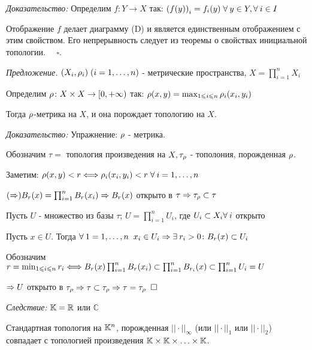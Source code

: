 \documentclass[../../main.tex]{subfiles}
\begin{document}
\textit{Доказательство:} Определим $f \colon Y \to X$ так: $\left( f(y) \right)_i = f_i(y) \; \forall\: y \in Y, \forall\: i \in I$

Отображение $f$ делает диаграмму (D) и является единственным отображением с этим свойством. Его непрерывность следует из теоремы о свойствах инициальной топологии. $\quad \square$.

\textit{Предложение.} $(X_i, \rho_i) \; (i = 1, \ldots, n)$ - метрические пространства, $X = \prod^n_{i = 1}X_i$

Определим $\rho\colon X \times X \to [0, +\infty)$ так: $\rho(x,y) = \max_{1 \leqslant i \leqslant n}\rho_i(x_i, y_i)$

Тогда $\rho$-метрика на $X$, и она порождает топологию на $X$.

\textit{Доказательство:} Упражнение: $\rho$ - метрика.

Обозначим $\tau = $ топология произведения на $X, \tau_{\rho}$ - тополония, порожденная $\rho$.

Заметим: $\rho(x, y) < r \Longleftrightarrow \rho_i(x_i, y_i) < r \; \forall\: i = 1, \ldots, n $

$(\Rightarrow) B_r(x) = \prod^n_{i = 1}B_r(x_i) \Rightarrow B_r(x)$ открыто в $\tau \Rightarrow \tau_{\rho} \subset \tau$

Пусть $U$ - множество из базы $\tau$; $U = \prod^n_{i = 1}U_i$, где $U_i \subset X_i \forall\: i$ открыто

Пусть $x \in U$. Тогда $\forall\: 1 = 1, \ldots, n \;\; x_i \in U_i \Rightarrow \exists\: r_i > 0 \colon B_r(x) \subset U_i$

Обозначим $r = \min_{1 \leqslant i \leqslant n} r_i \Longleftrightarrow B_r(x) \prod^n_{i = 1} B_r(x_i) \subset  \prod^n_{i = 1} B_{r_i}(x) \subset  \prod^n_{i = 1} U_i = U$

$\Rightarrow U$ открыто в $\tau_{\rho} \Rightarrow \tau \subset \tau_{\rho} \Rightarrow \tau = \tau_{\rho} \;\; \square$

\textit{Следствие:} $\mathbb{K} = \mathbb{R}$ или $\mathbb{C}$

Стандартная топология на $\mathbb{K}^n$, порожденная $||\cdot||_{\infty}$ (или $||\cdot||_1$ или $||\cdot||_2$) совпадает с топологией произведения $\mathbb{K} \times \mathbb{K} \times \ldots \times \mathbb{K}$.
\end{document}
